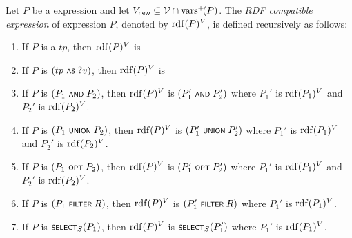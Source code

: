 Let $P$ be a {\SPARQLplus} expression and let $V_\mathsf{new} \subseteq \mathcal{V} \cap \mathrm{vars}^+\!(P)$.
The \emph{RDF compatible expression} of {\SPARQLplus} expression $P$,
denoted by $\mathrm{rdf}(P)^V$, is defined recursively as follows:
\begin{enumerate}
	\item If $P$ is a {\TPplus} $tp$, then $\mathrm{rdf}(P)^V$ is 
	\item If $P$ is $(tp \text{ \normalfont\scriptsize\textsf{AS} } ?v)$, then $\mathrm{rdf}(P)^V$ is 
	\item If $P$ is $(P_1 \text{ \normalfont\scriptsize\textsf{AND} } P_2)$, then $\mathrm{rdf}(P)^V$ is $(P_1' \text{ \normalfont\scriptsize\textsf{AND} } P_2')$ where $P_1'$ is $\mathrm{rdf}(P_1)^V$ and $P_2'$ is $\mathrm{rdf}(P_2)^V$.
	\item If $P$ is $(P_1 \text{ \normalfont\scriptsize\textsf{UNION} } P_2)$, then $\mathrm{rdf}(P)^V$ is $(P_1' \text{ \normalfont\scriptsize\textsf{UNION} } P_2')$ where $P_1'$ is $\mathrm{rdf}(P_1)^V$ and $P_2'$ is $\mathrm{rdf}(P_2)^V$.
	\item If $P$ is $(P_1 \text{ \normalfont\scriptsize\textsf{OPT} } P_2)$, then $\mathrm{rdf}(P)^V$ is $(P_1' \text{ \normalfont\scriptsize\textsf{OPT} } P_2')$ where $P_1'$ is $\mathrm{rdf}(P_1)^V$ and $P_2'$ is $\mathrm{rdf}(P_2)^V$.
	\item If $P$ is $(P_1 \text{ \normalfont\scriptsize\textsf{FILTER} } R)$, then $\mathrm{rdf}(P)^V$ is $(P_1' \text{ \normalfont\scriptsize\textsf{FILTER} } R)$ where $P_1'$ is $\mathrm{rdf}(P_1)^V$.
	\item If $P$ is $\text{\normalfont\scriptsize\textsf{SELECT}}_S(P_1)$, then $\mathrm{rdf}(P)^V$ is $\text{\normalfont\scriptsize\textsf{SELECT}}_S(P_1')$ where $P_1'$ is $\mathrm{rdf}(P_1)^V$.
\end{enumerate}